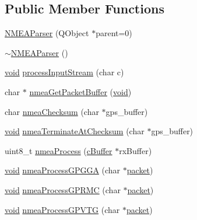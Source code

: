 \subsection*{\-Public \-Member \-Functions}
\begin{DoxyCompactItemize}
\item 
\hyperlink{group___g_p_s_gadget_plugin_gababc72322cf2d939a88939cc9036d884}{\-N\-M\-E\-A\-Parser} (\-Q\-Object $\ast$parent=0)
\item 
\hyperlink{group___g_p_s_gadget_plugin_gaedf659d241eff03757c31f3b80697f89}{$\sim$\-N\-M\-E\-A\-Parser} ()
\item 
\hyperlink{group___u_a_v_objects_plugin_ga444cf2ff3f0ecbe028adce838d373f5c}{void} \hyperlink{group___g_p_s_gadget_plugin_gaf4983b5649be1ec2deb7dafcd4a3573c}{process\-Input\-Stream} (char c)
\item 
char $\ast$ \hyperlink{group___g_p_s_gadget_plugin_ga5c79371e20badd15d23705c63eaacfe1}{nmea\-Get\-Packet\-Buffer} (\hyperlink{group___u_a_v_objects_plugin_ga444cf2ff3f0ecbe028adce838d373f5c}{void})
\item 
char \hyperlink{group___g_p_s_gadget_plugin_gaba9a601d8ec049e7f398b5d42cd974a1}{nmea\-Checksum} (char $\ast$gps\-\_\-buffer)
\item 
\hyperlink{group___u_a_v_objects_plugin_ga444cf2ff3f0ecbe028adce838d373f5c}{void} \hyperlink{group___g_p_s_gadget_plugin_gab0b239f615ef146897cec5c020735a8e}{nmea\-Terminate\-At\-Checksum} (char $\ast$gps\-\_\-buffer)
\item 
uint8\-\_\-t \hyperlink{group___g_p_s_gadget_plugin_ga55718bf48b8a95492b1aa43a65490e64}{nmea\-Process} (\hyperlink{group__buffer_ga63b2a19263ed371e329776b34f3164eb}{c\-Buffer} $\ast$rx\-Buffer)
\item 
\hyperlink{group___u_a_v_objects_plugin_ga444cf2ff3f0ecbe028adce838d373f5c}{void} \hyperlink{group___g_p_s_gadget_plugin_ga0ac80dbcc0ad8bec03f026c3feb2c097}{nmea\-Process\-G\-P\-G\-G\-A} (char $\ast$\hyperlink{group___antenna_track_gadget_plugin_gaa52c8cc41458c01d411d550d1e3f3d96}{packet})
\item 
\hyperlink{group___u_a_v_objects_plugin_ga444cf2ff3f0ecbe028adce838d373f5c}{void} \hyperlink{group___g_p_s_gadget_plugin_ga838f8b6c0bea66c17f82fec788a1a74f}{nmea\-Process\-G\-P\-R\-M\-C} (char $\ast$\hyperlink{group___antenna_track_gadget_plugin_gaa52c8cc41458c01d411d550d1e3f3d96}{packet})
\item 
\hyperlink{group___u_a_v_objects_plugin_ga444cf2ff3f0ecbe028adce838d373f5c}{void} \hyperlink{group___g_p_s_gadget_plugin_ga10893234aff922433723153e6057386e}{nmea\-Process\-G\-P\-V\-T\-G} (char $\ast$\hyperlink{group___antenna_track_gadget_plugin_gaa52c8cc41458c01d411d550d1e3f3d96}{packet})

\end{DoxyCompactItemize}
